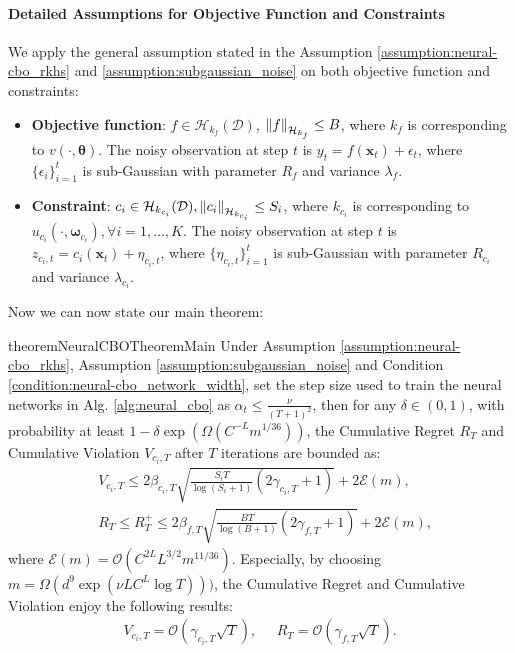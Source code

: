 \paragraph{Detailed Assumptions for Objective Function and Constraints}

We apply the general assumption stated in the Assumption \ref{assumption:neural-cbo_rkhs} and \ref{assumption:subgaussian_noise} on both objective function and constraints:

\begin{itemize}
    \item \textbf{Objective function}: $f \in \mathcal{H}_{k_f}(\mathcal{D})$, $\norm{f}_{\mathcal{H}_{k_f}} \leq B$,  where $k_f$ is corresponding to $v(\cdot, \boldsymbol{\theta})$. The noisy observation at step $t$ is $y_t = f(\mathbf{x}_t) +  \epsilon_t$, where $\{\epsilon_i\}_{i=1}^t$ is sub-Gaussian with parameter $R_f$ and variance $\lambda_f$.

    \item \textbf{Constraint}: $c_i \in \mathcal{H}_{k_{c_i}}(\mathcal{D}), \norm{c_i}_{\mathcal{H}_{k_{c_i}}} \leq S_i$, where $k_{c_i}$ is corresponding to $u_{c_i}(\cdot, \boldsymbol{\omega}_{c_i}), \forall i = 1, \dots, K$. The noisy observation at step $t$ is $z_{c_i,t} = c_i(\mathbf{x}_t) + \eta_{c_i, t}$, where $\{\eta_{c_i, t}\}_{i=1}^t$ is sub-Gaussian with parameter $R_{c_i}$ and variance $\lambda_{c_i}$.
\end{itemize}
Now we can now state our main theorem:
\begin{restatable}{theorem}{NeuralCBOTheoremMain}
\label{theorem:neural-cbo_main}
    Under Assumption \ref{assumption:neural-cbo_rkhs}, Assumption \ref{assumption:subgaussian_noise} and Condition \ref{condition:neural-cbo_network_width}, set the step size used to train the neural networks in Alg. \ref{alg:neural_cbo} as $\alpha_t \le \frac{\nu}{(T+1)^2}$, then for any $\delta \in (0,1)$,  with probability at least $1 - \delta \exp (\Omega(C^{-L} m^{1/36}))$, the Cumulative Regret $R_T$ and Cumulative Violation $V_{c_i, T}$ after $T$ iterations are bounded as:
    \begin{align*}
        & V_{c_i, T} \le 2 \beta_{c_i,T} \sqrt{\frac{S_i T}{\log(S_i+1)} (2\gamma_{c_i,T}+1)} + 2\mathcal{E}(m),
        \\
        & R_T \le R_T^+ \le 2 \beta_{f,T} \sqrt{\frac{B T}{\log(B+1)} (2\gamma_{f,T}+1)} + 2 \mathcal{E}(m),
    \end{align*}
where $\mathcal{E}(m) = \mathcal{O}(C^{2L} L^{3/2} m^{11/36})$. Especially, by choosing $m = \Omega(d^9 \exp (\nu LC^L\log T)))$, the Cumulative Regret and Cumulative Violation enjoy the  following results:
\begin{align*}
        V_{c_i, T} = \mathcal{O}(\gamma_{c_i,T} \sqrt{T}), \;\;\;\;\; R_T = \mathcal{O}(\gamma_{f,T} \sqrt{T}).
    \end{align*}
\end{restatable}
